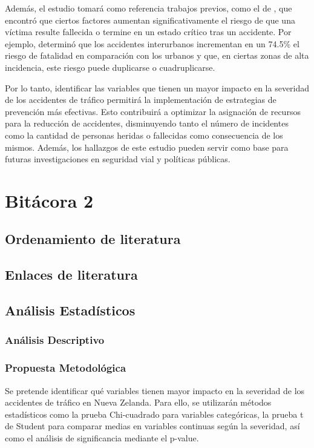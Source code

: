 \documentclass{book}
\begin{document}
Además, el estudio tomará como referencia trabajos previos, como el de \cite{BuitragoRamírezFrancisco2019Vpdv}, que encontró que ciertos factores aumentan significativamente el riesgo de que una víctima resulte fallecida o termine en un estado crítico tras un accidente. Por ejemplo, determinó que los accidentes interurbanos incrementan en un 74.5\% el riesgo de fatalidad en comparación con los urbanos y que, en ciertas zonas de alta incidencia, este riesgo puede duplicarse o cuadruplicarse.

Por lo tanto, identificar las variables que tienen un mayor impacto en la severidad de los accidentes de tráfico permitirá la implementación de estrategias de prevención más efectivas. Esto contribuirá a optimizar la asignación de recursos para la reducción de accidentes, disminuyendo tanto el número de incidentes como la cantidad de personas heridas o fallecidas como consecuencia de los mismos. Además, los hallazgos de este estudio pueden servir como base para futuras investigaciones en seguridad vial y políticas públicas.

\chapter*{Bitácora 2}
\section{Ordenamiento de literatura}

\section{Enlaces de literatura}

\section{Análisis Estadísticos}
\subsection{Análisis Descriptivo}

\subsection{Propuesta Metodológica}
Se pretende identificar qué variables tienen mayor impacto en la severidad de los accidentes de tráfico en Nueva Zelanda. Para ello, se utilizarán métodos estadísticos como la prueba Chi-cuadrado para variables categóricas, la prueba t de Student para comparar medias en variables continuas según la severidad, así como el análisis de significancia mediante el p-value. 
\end{document}

